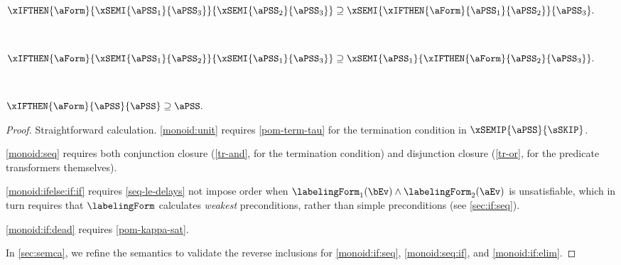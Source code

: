 \begin{lemma}
\begin{enumerate*}[label=(\alph*),ref=\alph*]
  \\\item \label{monoid:if:seq}
    \begin{math}
      \xIFTHEN{\aForm}{
        \xSEMI{\aPSS_1}{\aPSS_3}
      }{
        \xSEMI{\aPSS_2}{\aPSS_3}
      }
      \supseteq
      \xSEMI{
        \xIFTHEN{\aForm}{\aPSS_1}{\aPSS_2}
      }{
        \aPSS_3
      }.
    \end{math}

  \\\item \label{monoid:seq:if}
    \begin{math}
      \xIFTHEN{\aForm}{
        \xSEMI{\aPSS_1}{\aPSS_2}
      }{
        \xSEMI{\aPSS_1}{\aPSS_3}
      }
      \supseteq
      \xSEMI{
        \aPSS_1
      }{
        \xIFTHEN{\aForm}{\aPSS_2}{\aPSS_3}
      }.
    \end{math}

  \\\item \label{monoid:if:elim}
    \begin{math}
      \xIFTHEN{\aForm}{\aPSS}{\aPSS}
      \supseteq
      \aPSS.
    \end{math}
  \end{enumerate*}      
  \vspace{-.5\baselineskip}
  \begin{proof}
    Straightforward calculation.
    \eqref{monoid:unit} requires \ref{pom-term-tau} for
    the termination condition in $\xSEMIP{\aPSS}{\sSKIP}$.

    \eqref{monoid:seq} requires both
    conjunction closure (\ref{tr-and}, for the termination condition) and disjunction
    closure (\ref{tr-or}, for the predicate transformers themselves).

    \eqref{monoid:ifelse:if:if} requires \ref{seq-le-delays} not impose order
    when $\labelingForm_1(\bEv) \land \labelingForm_2(\aEv)$ is
    unsatisfiable, which in turn requires that $\labelingForm$ calculates
    \emph{weakest} preconditions, rather than simple preconditions (see
    \textsection\ref{sec:if:seq}).

    \eqref{monoid:if:dead} requires \ref{pom-kappa-sat}.

    In \textsection\ref{sec:semca}, we refine the semantics to validate the
    reverse inclusions for \eqref{monoid:if:seq}, \eqref{monoid:seq:if}, and
    \eqref{monoid:if:elim}.
  \end{proof}
\end{lemma}
